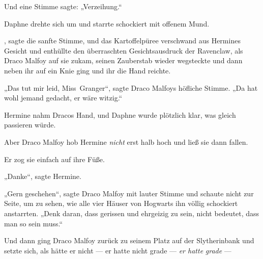 Und eine Stimme sagte:
„Verzeihung.“

Daphne drehte sich um und starrte schockiert mit offenem Mund.

, sagte die sanfte Stimme, und das Kartoffelpüree verschwand aus Hermines Gesicht und enthüllte den überraschten Gesichtsausdruck der Ravenclaw, als Draco Malfoy auf sie zukam, seinen Zauberstab wieder wegsteckte und dann neben ihr auf ein Knie ging und ihr die Hand reichte.

„Das tut mir leid, Miss~Granger“, sagte Draco Malfoys höfliche Stimme.
„Da hat wohl jemand gedacht, er wäre witzig.“

Hermine nahm Dracos Hand, und Daphne wurde plötzlich klar, was gleich passieren würde.

Aber Draco Malfoy hob Hermine \emph{nicht} erst halb hoch und ließ sie dann fallen.

Er zog sie einfach auf ihre Füße.

„Danke“, sagte Hermine.

„Gern geschehen“, sagte Draco Malfoy mit lauter Stimme und schaute nicht zur Seite, um zu sehen, wie alle vier Häuser von Hogwarts ihn völlig schockiert anstarrten.
„Denk daran, dass gerissen und ehrgeizig zu sein, nicht bedeutet, dass man so sein muss.“

Und dann ging Draco Malfoy zurück zu seinem Platz auf der Slytherinbank und setzte sich, als hätte er nicht — er hatte nicht grade — \emph{er hatte} \emph{grade} —

